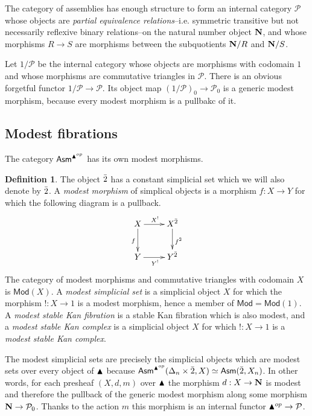 \documentclass{amsart}
\theoremstyle{plain}
\theoremstyle{definition}
\newtheorem{defin}[theorem]{Definition}
\newcommand\cat\mathcal
\begin{document}
\newcommand\pers{\cat P}
The category of assemblies has enough structure to form an internal category $\pers$ whose objects are \emph{partial equivalence relations}--i.e. symmetric transitive but not necessarily reflexive binary relations--on the natural number object $\mathbf{N}$, and whose morphisms $R\to S$ are morphisms between the subquotients $\mathbf{N}/R$ and $\mathbf{N}/S$. 

Let $1/\pers$ be the internal category whose objects are morphisms with codomain $1$ and whose morphisms are commutative triangles in $\pers$. There is an obvious forgetful functor $1/\pers \to \pers$. Its object map $(1/\pers)_0 \to \pers_0$ is a generic modest morphism, because every modest morphism is a pullbakc of it. %

\newcommand\modkanfib{\mathsf{MSKF}}
\subsection{Modest fibrations}
The category $\mathsf{Asm}^{\blacktriangle^{op}}$ has its own modest morphisms.

\newcommand\modfib{\mathsf{Mod}}
\begin{defin} The object ${\bar{2}}$ has a constant simplicial set which we will also denote by ${\bar{2}}$. A \emph{modest morphism} of simplical objects is a morphism $f:X\to Y$ for which the following diagram is a pullback.
\[\xymatrix{
X \ar[r]^{X^\bang} \ar[d]_{f} & X^{\boldy} \ar[d]^{f^{\boldy}}\\
Y \ar[r]_{Y^\bang} & Y^{\boldy}
}\]
The category of modest morphisms and commutative triangles with codomain $X$ is $\modfib(X)$. A \emph{modest simplicial set} is a simplicial object $X$ for which the morphism $!:X\to 1$ is a modest morphism, hence a member of $\modfib = \modfib(1)$. A \emph{modest stable Kan fibration} is a stable Kan fibration which is also modest, and a \emph{modest stable Kan complex} is a simplicial object $X$ for which $!:X\to 1$ is a \emph{modest stable Kan complex}.
\end{defin}%

The modest simplicial sets are precisely the simplicial objects which are modest sets over every object of $\blacktriangle$ because $\mathsf{Asm}^{\blacktriangle^{op}}(\Delta_n\times {\bar{2}}, X)\simeq \mathsf{Asm}({\bar{2}}, X_n)$. In other words, for each presheaf $(X,d,m)$ over $\blacktriangle$ the morphism $d:X\to \mathbf{N}$ is modest and therefore the pullback of the generic modest morphism along some morphism $\nno \to \pers_0$. Thanks to the action $m$ this morphism is an internal functor $\simpcat\dual\to\pers$. %
\end{document}
